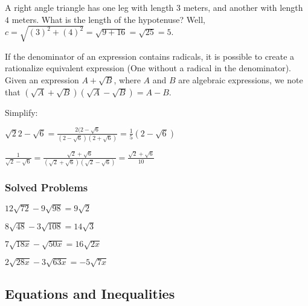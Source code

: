 \documentclass[crop=false,class=book,oneside]{standalone}
\begin{document}
            \begin{example}
            A right angle triangle has one leg with length $3$ meters, and another with length $4$ meters. What is the length of the hypotenuse? Well, $c = \sqrt{(3)^2+(4)^2} = \sqrt{9+16} = \sqrt{25} = 5$.
            \end{example}
            \begin{remark}
            If the denominator of an expression contains radicals, it is possible to create a rationalize equivalent expression (One without a radical in the denominator). Given an expression $A+\sqrt{B}$, where $A$ and $B$ are algebraic expressions, we note that $(\sqrt{A}+\sqrt{B})(\sqrt{A}-\sqrt{B}) = A-B$. 
            \end{remark}
            \begin{example}
            Simplify:
            \begin{enumerate}
            \begin{multicols}{2}
            \item $\sqrt{2}{2-\sqrt{6}} = \frac{2(2-\sqrt{6}}{(2-\sqrt{6})(2+\sqrt{6})} = \frac{1}{5}(2-\sqrt{6})$
            \item $\frac{1}{\sqrt{2}-\sqrt{6}} = \frac{\sqrt{2}+\sqrt{6}}{(\sqrt{2}+\sqrt{6})(\sqrt{2}-\sqrt{6})} = \frac{\sqrt{2}+\sqrt{6}}{10}$
            \end{multicols}
            \end{enumerate}
            \end{example}
            \subsubsection{Solved Problems}
            \begin{enumerate}
            \begin{multicols}{4}
            \item $12\sqrt{72} - 9\sqrt{98} = 9\sqrt{2}$
            \item $8\sqrt{48} - 3\sqrt{108} = 14\sqrt{3}$
            \item $7\sqrt{18x} - \sqrt{50x} = 16\sqrt{2x}$
            \item $2\sqrt{28x} - 3\sqrt{63x} = -5\sqrt{7x}$
            \end{multicols}
            \end{enumerate}
        \subsection{Equations and Inequalities}
\end{document}

